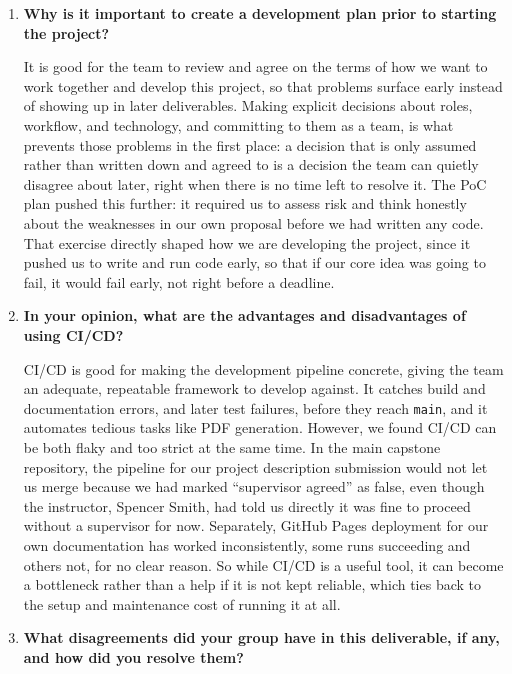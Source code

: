 \documentclass{article}
\begin{document}
\begin{enumerate}
    \item \textbf{Why is it important to create a development plan prior to
    starting the project?}

    It is good for the team to review and agree on the terms of how
    we want to work together and develop this project, so that problems
    surface early instead of showing up in later deliverables. Making
    explicit decisions about roles, workflow, and technology, and
    committing to them as a team, is what prevents those problems in the
    first place: a decision that is only assumed rather than written down
    and agreed to is a decision the team can quietly disagree about later,
    right when there is no time left to resolve it. The PoC plan pushed
    this further: it required us to assess risk and think honestly about
    the weaknesses in our own proposal before we had written any code.
    That exercise directly shaped how we are developing the project, since
    it pushed us to write and run code early, so that if our core idea was
    going to fail, it would fail early, not right before a deadline.
    \item \textbf{In your opinion, what are the advantages and
    disadvantages of using CI/CD?}

    CI/CD is good for making the development pipeline concrete,
    giving the team an adequate, repeatable framework to develop against.
    It catches build and documentation errors, and later test failures,
    before they reach \texttt{main}, and it automates tedious tasks like
    PDF generation. However, we found CI/CD can be both flaky and too
    strict at the same time. In the main capstone repository, the
    pipeline for our project description submission would not let us
    merge because we had marked ``supervisor agreed'' as false, even
    though the instructor, Spencer Smith, had told us directly it was fine
    to proceed without a supervisor for now. Separately, GitHub Pages
    deployment for our own documentation has worked inconsistently, some
    runs succeeding and others not, for no clear reason. So while CI/CD is
    a useful tool, it can become a bottleneck rather than a help if it is
    not kept reliable, which ties back to the setup and maintenance cost
    of running it at all.
    \item \textbf{What disagreements did your group have in this
    deliverable, if any, and how did you resolve them?}


\end{enumerate}
\end{document}
